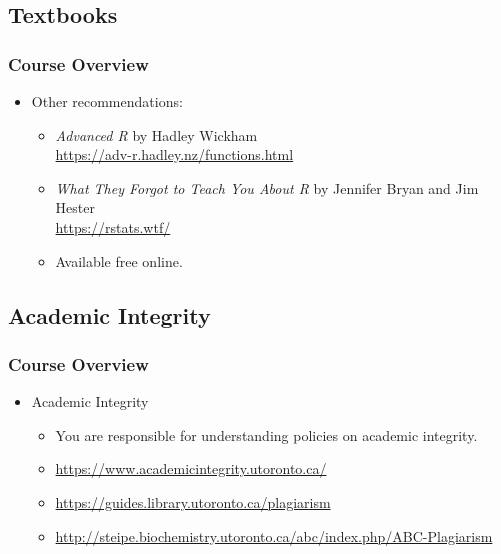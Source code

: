 \documentclass[11pt]{beamer}
\begin{document}
\subsection{Textbooks}
\begin{frame}
\frametitle{Course Overview}
\begin{itemize}
\item Other recommendations:
\begin{itemize}
\vspace{0.2in}
\item \textit{Advanced R} by Hadley Wickham \\
\url{https://adv-r.hadley.nz/functions.html}
\vspace{0.2in}
\item \textit{What They Forgot to Teach You About R} by Jennifer Bryan and Jim Hester \\
\url{https://rstats.wtf/}
\vspace{0.2in}
\item Available free online.
\end{itemize}
\end{itemize}
\end{frame}


\subsection{Academic Integrity}
\begin{frame}
\frametitle{Course Overview}
\begin{itemize}
\item Academic Integrity
\vspace{0.2in}
\begin{itemize}
\item You are responsible for understanding policies on academic integrity.
\vspace{0.2in}
\item \url{https://www.academicintegrity.utoronto.ca/}
\vspace{0.2in}
\item \url{https://guides.library.utoronto.ca/plagiarism}
\vspace{0.2in}
\item \url{http://steipe.biochemistry.utoronto.ca/abc/index.php/ABC-Plagiarism}
\end{itemize}
\end{itemize}
\end{frame}
\end{document}
